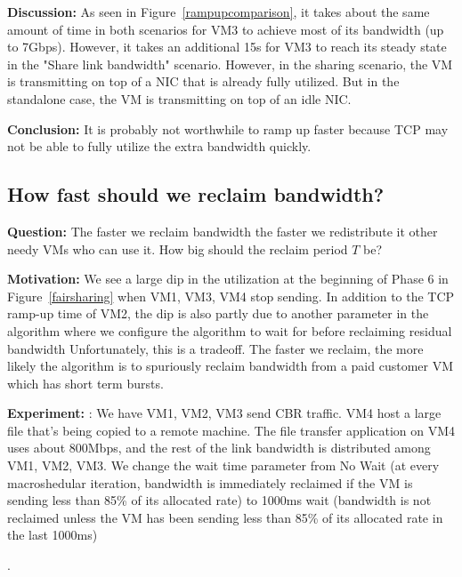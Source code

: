 {\bf Discussion:} As seen in Figure~\ref{rampupcomparison}, it takes about the
same amount of time in both scenarios for VM3 to achieve most of its bandwidth
(up to 7Gbps). However, it takes an additional 15s for VM3 to reach its steady
state  in the "Share link bandwidth" scenario. However, in the sharing scenario,
the VM is transmitting on top of a NIC that is already fully utilized.
But in the standalone case, the VM is transmitting on top of an idle NIC. 

{\bf Conclusion:} It is probably not worthwhile 
to ramp up faster because TCP may not be able to fully utilize the extra
bandwidth quickly.

\subsection{How fast should we reclaim bandwidth?}
{\bf Question:}  The faster we reclaim bandwidth the
faster we redistribute it other needy VMs who can use it. How big should the
reclaim period $T$ be?

{\bf Motivation:} 
We see a large dip in the utilization at the beginning of Phase 6 in
Figure~\ref{fairsharing} when VM1, VM3, VM4 stop sending.  In addition to the
TCP ramp-up time of VM2, the dip is also partly due to another parameter in the
algorithm where we configure the algorithm to wait for  before
reclaiming residual bandwidth  Unfortunately, this is a tradeoff.  The faster we
reclaim, the more likely the algorithm is to spuriously reclaim bandwidth from a
paid customer VM which has short term bursts.

{\bf Experiment:} : We have VM1, VM2, VM3 send CBR traffic. VM4 host a large
file that's being copied to a remote machine.  The file transfer application on
VM4 uses about 800Mbps, and the rest of the link bandwidth is distributed among
VM1, VM2, VM3.  We change the wait time parameter from No Wait (at every
macroshedular iteration, bandwidth is immediately reclaimed if the VM is
sending less than 85\% of its allocated rate) to 1000ms wait (bandwidth is not
reclaimed unless the VM has been sending less than 85\% of its allocated rate in
the last 1000ms)

.

